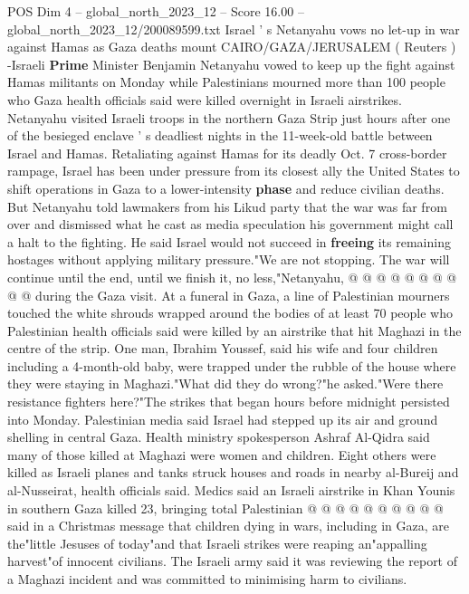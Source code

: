 \begin{textsample}{POS Dim 4 – global\_north\_2023\_12 – Score 16.00 – global\_north\_2023\_12/200089599.txt}  \label{ex:f4_pos_320}
Israel ' s Netanyahu vows no let-up in war against Hamas as Gaza deaths mount CAIRO/GAZA/JERUSALEM ( Reuters ) -Israeli \textbf{Prime} Minister Benjamin Netanyahu vowed to keep up the fight against Hamas militants on Monday while Palestinians mourned more than 100 people who Gaza health officials said were killed overnight in Israeli airstrikes.
Netanyahu visited Israeli troops in the northern Gaza Strip just hours after one of the besieged enclave ' s deadliest nights in the 11-week-old battle between Israel and Hamas.
Retaliating against Hamas for its deadly Oct. 7 cross-border rampage, Israel has been under pressure from its closest ally the United States to shift operations in Gaza to a lower-intensity \textbf{phase} and reduce civilian deaths.
But Netanyahu told lawmakers from his Likud party that the war was far from over and dismissed what he cast as media speculation his government might call a halt to the fighting.
He said Israel would not succeed in \textbf{freeing} its remaining hostages without applying military pressure."We are not stopping.
The war will continue until the end, until we finish it, no less,"Netanyahu, @ @ @ @ @ @ @ @ @ @ during the Gaza visit.
At a funeral in Gaza, a line of Palestinian mourners touched the white shrouds wrapped around the bodies of at least 70 people who Palestinian health officials said were killed by an airstrike that hit Maghazi in the centre of the strip.
One man, Ibrahim Youssef, said his wife and four children including a 4-month-old baby, were trapped under the rubble of the house where they were staying in Maghazi."What did they do wrong?"he asked."Were there resistance fighters here?"The strikes that began hours before midnight persisted into Monday.
Palestinian media said Israel had stepped up its air and ground shelling in central Gaza.
Health ministry spokesperson Ashraf Al-Qidra said many of those killed at Maghazi were women and children.
Eight others were killed as Israeli planes and tanks struck houses and roads in nearby al-Bureij and al-Nusseirat, health officials said.
Medics said an Israeli airstrike in Khan Younis in southern Gaza killed 23, bringing total Palestinian @ @ @ @ @ @ @ @ @ @ said in a Christmas message that children dying in wars, including in Gaza, are the"little Jesuses of today"and that Israeli strikes were reaping an"appalling harvest"of innocent civilians.
The Israeli army said it was reviewing the report of a Maghazi incident and was committed to minimising harm to civilians.

\end{textsample}
